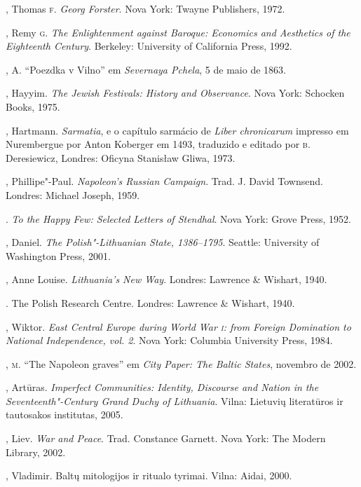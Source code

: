 \begin{bibliohedra}
  , Thomas \textsc{f}. \textit{Georg Forster}. Nova York: Twayne Publishers,
  1972.

  , Remy \textsc{g}. \textit{The Enlightenment against Baroque: Economics
  and Aesthetics of the Eighteenth Century}. Berkeley: University of
  California Press, 1992.

  , A. ``Poezdka v Vilno'' em \textit{Severnaya Pchela}, 5 de maio de
  1863.

  , Hayyim. \textit{The Jewish Festivals: History and Observance}.
  Nova York: Schocken Books, 1975.

  , Hartmann. \textit{Sarmatia}, e o capítulo sarmácio de
  \textit{Liber chronicarum} impresso em Nurembergue por Anton Koberger em
  1493, traduzido e editado por \textsc{b}.\,Deresiewicz, Londres: Oficyna
  Stanisław Gliwa, 1973.

  , Phillipe"-Paul. \textit{Napoleon's Russian Campaign}. Trad. J.
  David Townsend. Londres: Michael Joseph, 1959.

  . \textit{To the Happy Few: Selected Letters of Stendhal}. Nova
  York: Grove Press, 1952.

  , Daniel. \textit{The Polish"-Lithuanian State, 1386--1795}. Seattle:
  University of Washington Press, 2001.

  , Anne Louise. \textit{Lithuania's New Way}. Londres: Lawrence \&
  Wishart, 1940.

  . The Polish Research Centre. Londres:
  Lawrence \& Wishart, 1940.

  , Wiktor. \textit{East Central Europe during World War \textsc{i}:
  from Foreign Domination to National Independence, vol. 2}. Nova York:
  Columbia University Press, 1984.

  , \textsc{m}. ``The Napoleon graves'' em \textit{City Paper: The Baltic
  States}, novembro de 2002.

  , Artūras. \textit{Imperfect Communities: Identity, Discourse
  and Nation in the Seventeenth"-Century Grand Duchy of Lithuania}.
  Vilna: Lietuvių literatūros ir tautosakos institutas, 2005.

  , Liev. \textit{War and Peace}. Trad. Constance Garnett. Nova York:
  The Modern Library, 2002.

  , Vladimir. Baltų mitologijos ir ritualo tyrimai. Vilna:
  Aidai, 2000.


\end{bibliohedra}
